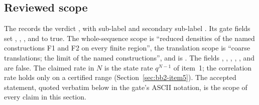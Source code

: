 \subsection{Reviewed scope}
\label{sec:bb2-scope}
The  records the
verdict , with sub-label
 and secondary sub-label
. Its gate fields set
, ,
,  and
 to true. The whole-sequence scope is ``reduced
densities of the named constructions F1 and F2 on every finite region'', the
translation scope is ``coarse translations; the limit of the named
constructions'', and  is
. The fields
,
, ,
, ,
 and  are
false. The claimed rate in $N$ is the state rate $q^{N-1}$ of item~1; the
correlation rate holds only on a certified range (Section~\ref{sec:bb2-item5}).
The accepted statement, quoted verbatim below in the gate's ASCII notation, is
the scope of every claim in this section.
